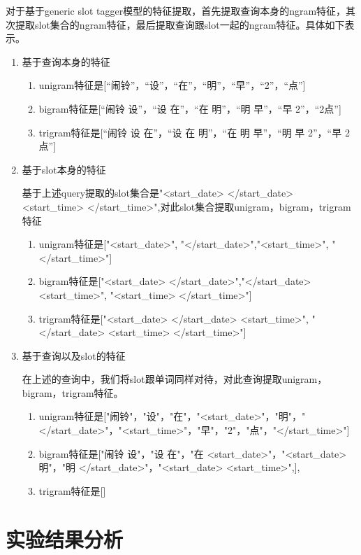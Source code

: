 \documentclass[master]{njuthesis}
\begin{document}
   
    对于基于generic slot tagger模型的特征提取，首先提取查询本身的ngram特征，其次提取slot集合的ngram特征，最后提取查询跟slot一起的ngram特征。具体如下表示。
\begin{enumerate}
  \item 基于查询本身的特征
    \begin{enumerate}
      \item unigram特征是[“闹铃”，“设”，“在”，“明”，“早”，“2”，“点”]
      \item bigram特征是[“闹铃 设”，“设 在”，“在 明”，“明 早”，“早 2”，“2点”]
      \item trigram特征是[“闹铃 设 在”，“设 在 明”，“在 明 早”，“明 早 2”，“早 2 点”]
    \end{enumerate}
  \item 基于slot本身的特征
    
   基于上述query提取的slot集合是"<start\_date> </start\_date> <start\_time> </start\_time>",对此slot集合提取unigram，bigram，trigram特征
    \begin{enumerate}
      \item unigram特征是["<start\_date>", "</start\_date>","<start\_time>", "</start\_time>"]
      \item bigram特征是["<start\_date> </start\_date>","</start\_date> <start\_time>", "<start\_time> </start\_time>"]
      \item trigram特征是["<start\_date> </start\_date> <start\_time>", "</start\_date> <start\_time> </start\_time>"]
    \end{enumerate} 
  \item 基于查询以及slot的特征
   
   在上述的查询中，我们将slot跟单词同样对待，对此查询提取unigram，bigram，trigram特征。
   \begin{enumerate}
     \item unigram特征是["闹铃"，"设"，"在"，"<start\_date>"，"明"，"</start\_date>"，"<start\_time>"，"早"，"2"，"点"，"</start\_time>"]
     \item bigram特征是["闹铃 设"，"设 在"，"在 <start\_date>"，"<start\_date> 明"，"明 </start\_date>"，"<start\_date> <start\_time>",],
     \item trigram特征是[]
   \end{enumerate}
\end{enumerate}
\section{实验结果分析}
\end{document}
